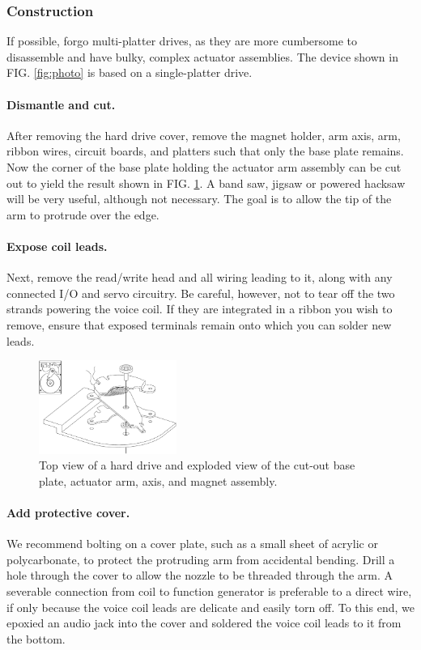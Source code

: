 \documentclass[11.5pt]{book}
\begin{document}
\subsubsection{Construction}
If possible, forgo multi-platter drives, as they are more cumbersome to disassemble and have
bulky, complex actuator assemblies. The device shown in FIG. \ref{fig:photo}
is based on a single-platter drive.

\paragraph{Dismantle and cut.} After removing the hard drive cover, remove
the magnet holder, arm axis, arm, ribbon wires, circuit boards, and platters
such that only the base plate remains. Now the corner of the base plate holding
the actuator arm assembly can be cut out to yield the result shown in FIG.
\ref{fig:designschematic}. A band saw, jigsaw or powered hacksaw will be very
useful, although not necessary. The goal is to allow the tip of the arm to
protrude over the edge.

\paragraph{Expose coil leads.} Next, remove the read/write head and all
wiring leading to it, along with any connected I/O and servo circuitry. Be
careful, however, not to tear off the two strands powering the voice coil. If
they are integrated in a ribbon you wish to remove, ensure that exposed
terminals remain onto which you can solder new leads.
\begin{figure}
\centering
\includegraphics[width=0.4\textwidth]{papers/hdg_images/dropletgenerator_exploded.pdf}
\caption{Top view of a hard drive and exploded view of the cut-out base
plate, actuator arm, axis, and magnet assembly. \label{fig:designschematic}}
\end{figure}
\paragraph{Add protective cover.} We recommend bolting on a cover plate, such
as a small sheet of acrylic or polycarbonate, to protect the protruding arm from
accidental bending. Drill a hole through the cover to allow the nozzle to be
threaded through the arm. A severable
connection from coil to function generator is preferable to a direct wire, if
only because the voice coil leads are delicate and easily torn off. To this end, we epoxied
an audio jack into the cover and soldered the voice coil leads to it from the
bottom. 
\end{document}
